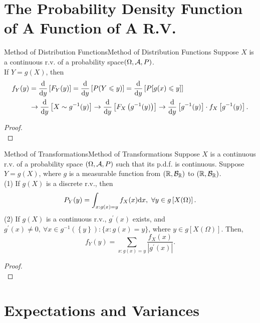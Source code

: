 \documentclass{elegantbook}
\begin{document}
\section{The Probability Density Function of A Function of A R.V.}

\begin{theorem}{Method of Distribution Functions}{Method of Distribution Functions}
Suppose $X$ is a continuous r.v. of a probability space$(\Omega,\mathcal{A}, P)$.\\
If $Y=g(X)$, then
$$\begin{aligned}
f_Y(y)&=\frac{\mathrm{d}}{\mathrm{d} y}\left[F_Y(y)\right]=\frac{\mathrm{d}}{\mathrm{d} y}\left[P(Y\leqslant y)\right]=\frac{\mathrm{d}}{\mathrm{d} y}\left[P[g(x)\leqslant y]\right]\\
&\rightarrow\frac{\mathrm{d}}{\mathrm{d} y}\left[X\sim g^{-1}(y)\right]\rightarrow\frac{\mathrm{d}}{\mathrm{d} y}\left[F_X\left(g^{-1}(y)\right)\right]\rightarrow\frac{\mathrm{d}}{\mathrm{d} y}\left[g^{-1}(y)\right]\cdot f_X\left[g^{-1}(y)\right].
\end{aligned}
$$
\end{theorem}

\begin{proof}
\\[4cm]\vspace{0.01cm}
\end{proof}

\begin{theorem}{Method of Transformations}{Method of Transformations}
Suppose $X$ is a continuous r.v. of a probability space $(\Omega,\mathcal{A}, P)$ such that its p.d.f. is continuous. Suppose $Y=g(X)$, where $g$ is a measurable function from $(\mathbb{R},\mathcal{B}_\mathbb{R})$ to $(\mathbb{R},\mathcal{B}_\mathbb{R})$.\\
(1) If $g(X)$ is a discrete r.v., then
$$
P_Y(y)=\int_{x:g(x)=y}{f_X(x)\dif x},\ \forall y\in g\left[X(\Omega)\right].
$$
(2) If $g(X)$ is a continuous r.v., $g^\prime(x)$ exists, and $g^\prime(x)\neq0,\ \forall x\in g^{-1}\left(\left\{y\right\}\right):\{x:g(x)=y\}$, where $y\in g\left[X(\Omega)\right]$. Then,
$$
f_Y(y)=\sum_{x:g(x)=y}\frac{f_X(x)}{|g^\prime(x)|}.
$$
\end{theorem}

\begin{proof}
\\[4cm]\vspace{0.01cm}
\end{proof}

\section{Expectations and Variances}
\end{document}
